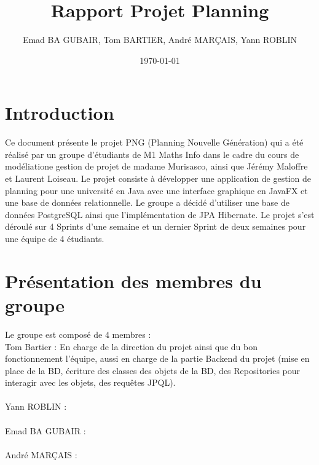 \documentclass[a4paper,12pt]{article}
\title{Rapport Projet Planning}
\author{Emad BA GUBAIR, Tom BARTIER, André MARÇAIS, Yann ROBLIN}
\date{\today}
\begin{document}
\maketitle

\tableofcontents
\newpage
\section{Introduction}
Ce document présente le projet PNG (Planning Nouvelle Génération) qui a été réalisé par un groupe d'étudiants
de M1 Maths Info dans le cadre du cours de modéliatione gestion de projet de madame Murisasco, ainsi que 
Jérémy Maloffre et Laurent Loiseau. Le projet consiste à développer une application
de gestion de planning pour une université en Java avec une interface graphique en JavaFX et une base de données
relationnelle. Le groupe a décidé d'utiliser une base de données PostgreSQL ainsi que l'implémentation de JPA Hibernate.
Le projet s'est déroulé sur 4 Sprints d'une semaine et un dernier Sprint de deux semaines pour une équipe de 
4 étudiants.
\section{Présentation des membres du groupe}
Le groupe est composé de 4 membres :\\
Tom Bartier : En charge de la direction du projet ainsi que du bon fonctionnement l'équipe, aussi en charge de la partie
Backend du projet (mise en place de la BD, écriture des classes des objets de la BD, des Repositories pour interagir avec les objets, 
des requêtes JPQL).\\\\
Yann ROBLIN :   \\\\%
Emad BA GUBAIR :   \\\\%
André MARÇAIS :  \\\\%
\end{document}
